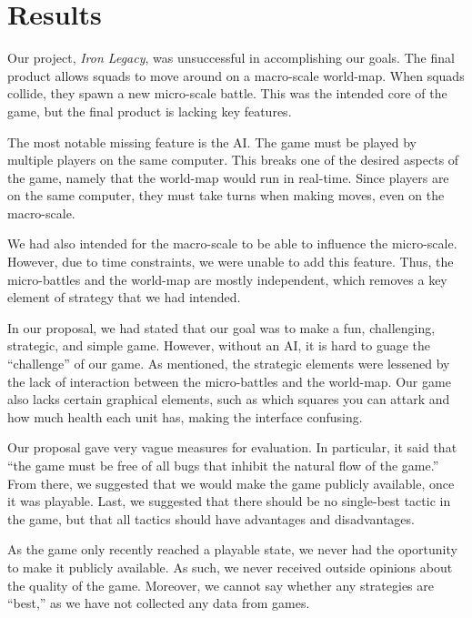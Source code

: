 \documentclass{article}
\begin{document}
\section*{Results}

Our project, \emph{Iron Legacy}, was unsuccessful in accomplishing
    our goals.
    The final product allows squads to move around on a macro-scale world-map.
    When squads collide, they spawn a new micro-scale battle.
    This was the intended core of the game, but the final product is lacking
    key features.

The most notable missing feature is the AI.
    The game must be played by multiple players on the same computer.
    This breaks one of the desired aspects of the game,
    namely that the world-map would run in real-time.
    Since players are on the same computer, they must take turns when making
    moves, even on the macro-scale.

We had also intended for the macro-scale to be able to influence the
    micro-scale.
    However, due to time constraints, we were unable to add this feature.
    Thus, the micro-battles and the world-map are mostly independent,
    which removes a key element of strategy that we had intended.

In our proposal, we had stated that our goal was to make a fun, challenging,
    strategic, and simple game.
    However, without an AI, it is hard to guage the ``challenge'' of our game.
    As mentioned, the strategic elements were lessened by the lack of
    interaction between the micro-battles and the world-map.
    Our game also lacks certain graphical elements, such as which squares
    you can attark and how much health each unit has, making the interface
    confusing.

Our proposal gave very vague measures for evaluation.
    In particular, it said that ``the game must be free of all bugs that
    inhibit the natural flow of the game.''
    From there, we suggested that we would make the game publicly available,
    once it was playable.
    Last, we suggested that there should be no single-best tactic in the game,
    but that all tactics should have advantages and disadvantages.

As the game only recently reached a playable state,
    we never had the oportunity to make it publicly available.
    As such, we never received outside opinions about the quality of the game.
    Moreover, we cannot say whether any strategies are ``best,''
    as we have not collected any data from games.
\end{document}
